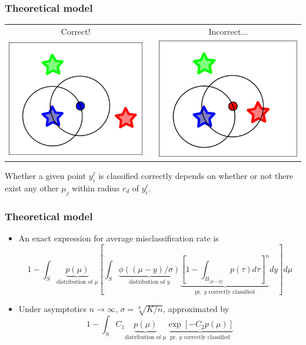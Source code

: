\documentclass{beamer}
\begin{document}
\begin{frame}
\frametitle{Theoretical model}
\begin{center}
\begin{tabular}{ccc}
Correct! & & Incorrect...\\
\includegraphics[scale=0.5]{fig04a.png} & & 
\includegraphics[scale=0.5]{fig04b.png}
\end{tabular}
\end{center}

Whether a given point $y_i^\ell$ is classified correctly depends on
whether or not there exist any other $\mu_j$ within radius $r_d$ of
$y_i^\ell$.
\end{frame}



\begin{frame}
\frametitle{Theoretical model}
\begin{itemize}
\item An exact expression for average misclassification rate is
\[
1 - \int_S \underbrace{p(\mu)}_{\text{distribution of }\mu}
\left[
\int_S \underbrace{\phi((\mu - y)/\sigma)}_{\text{distribution of }y}
\underbrace{\left[1 - \int_{B_{||\mu - y||}} p(\tau) d\tau \right]^n
}_{\text{pr. $y$ correctly classified}}
dy\right]
d\mu
\]
\item Under asymptotics $n \to \infty$, $\sigma = \sqrt[d]{K/n}$,
approximated by
\[
1 - \int_S C_1 \underbrace{p(\mu)}_{\text{distribution of }\mu} \underbrace{\exp[-C_2 p(\mu)]}_{\text{pr. $y$ correctly classified}}
\]
\end{itemize}
\end{frame}
\end{document}
